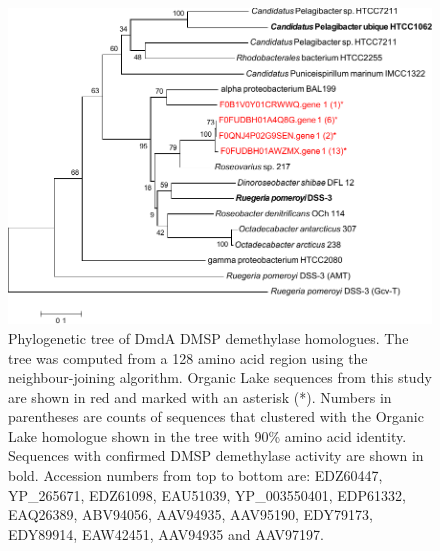 \begin{figure}
\includegraphics{orglake_figures/dmdA_tree.pdf}
\caption[Phylogenetic tree of DmdA DMSP demethylase homologues]{Phylogenetic tree of DmdA DMSP demethylase homologues. The tree was computed from a 128 amino acid region using the neighbour-joining algorithm. Organic Lake sequences from this study are shown in red and marked with an asterisk (*). Numbers in parentheses are counts of sequences that clustered with the Organic Lake homologue shown in the tree with 90\% amino acid identity. Sequences with confirmed DMSP demethylase activity are shown in bold. Accession numbers from top to bottom are: EDZ60447, YP\_265671, EDZ61098, EAU51039, YP\_003550401, EDP61332, EAQ26389, ABV94056, AAV94935, AAV95190, EDY79173, EDY89914, EAW42451, AAV94935 and AAV97197.}
\label{fig:dmdA_tree}

\end{figure}
